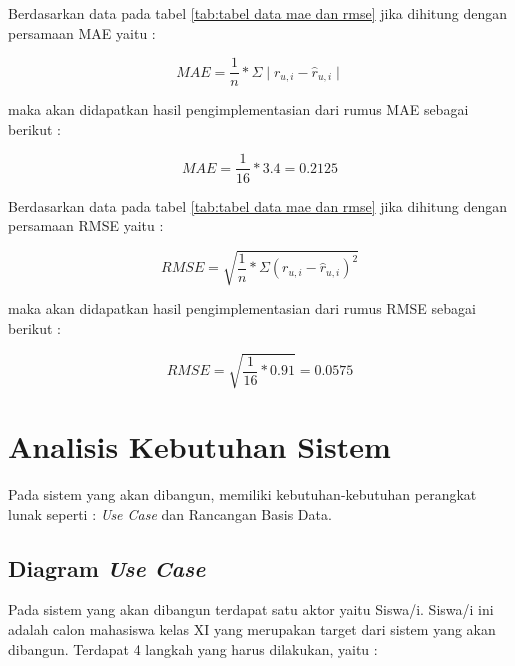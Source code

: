 Berdasarkan data pada tabel \ref{tab:tabel data mae dan rmse} jika dihitung dengan persamaan MAE yaitu :

\begin{equation}
    MAE = \frac{1}{n} * \Sigma \mid r_{u,i}-\hat{r}_{u,i} \mid
\end{equation}

maka akan didapatkan hasil pengimplementasian dari rumus MAE sebagai berikut :

\begin{equation}
    MAE = \frac{1}{16} * 3.4 = 0.2125 
\end{equation}

Berdasarkan data pada tabel \ref{tab:tabel data mae dan rmse} jika dihitung dengan persamaan RMSE yaitu :

\begin{equation}
    RMSE = \sqrt{\frac{1}{n} * \Sigma (r_{u,i}-\hat{r}_{u,i})^2}
\end{equation}

maka akan didapatkan hasil pengimplementasian dari rumus RMSE sebagai berikut :

\begin{equation}
    RMSE = \sqrt{\frac{1}{16} * 0.91} = 0.0575
\end{equation}

\section{Analisis Kebutuhan Sistem}
\label{analisis kebutuhan sistem}
Pada sistem yang akan dibangun, memiliki kebutuhan-kebutuhan perangkat lunak seperti : \textit{Use Case} dan Rancangan Basis Data.

\subsection{Diagram \textit{Use Case}}
Pada sistem yang akan dibangun terdapat satu aktor yaitu Siswa/i. Siswa/i ini adalah calon mahasiswa kelas XI yang merupakan target dari sistem yang akan dibangun. Terdapat 4 langkah yang harus dilakukan, yaitu :

